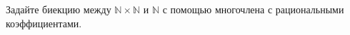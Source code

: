 Задайте биекцию между $\mathbb{N} \times \mathbb{N}$ и $\mathbb{N}$ с помощью многочлена с рациональными коэффициентами.